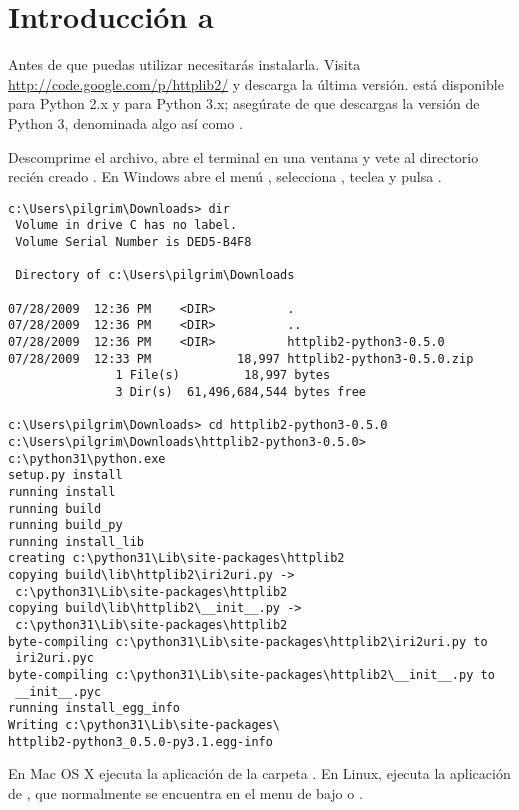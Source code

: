 \section{Introducción a }
\label{sec:httplib2}

Antes de que puedas utilizar  necesitarás instalarla. Visita \href{http://code.google.com/p/httplib2/}{http://code.google.com/p/httplib2/} y descarga la última versión.  está disponible para Python 2.x y para Python 3.x; asegúrate de que descargas la versión de Python 3, denominada algo así como .

Descomprime el archivo, abre el terminal en una ventana y vete al directorio recién creado . En Windows abre el menú , selecciona , teclea  y pulsa .

\noindent\begin{minipage}{\textwidth}
\begin{lstlisting}[mathescape=False]
c:\Users\pilgrim\Downloads> dir
 Volume in drive C has no label.
 Volume Serial Number is DED5-B4F8

 Directory of c:\Users\pilgrim\Downloads

07/28/2009  12:36 PM    <DIR>          .
07/28/2009  12:36 PM    <DIR>          ..
07/28/2009  12:36 PM    <DIR>          httplib2-python3-0.5.0
07/28/2009  12:33 PM            18,997 httplib2-python3-0.5.0.zip
               1 File(s)         18,997 bytes
               3 Dir(s)  61,496,684,544 bytes free

c:\Users\pilgrim\Downloads> cd httplib2-python3-0.5.0
c:\Users\pilgrim\Downloads\httplib2-python3-0.5.0> c:\python31\python.exe 
setup.py install
running install
running build
running build_py
running install_lib
creating c:\python31\Lib\site-packages\httplib2
copying build\lib\httplib2\iri2uri.py -> 
 c:\python31\Lib\site-packages\httplib2
copying build\lib\httplib2\__init__.py -> 
 c:\python31\Lib\site-packages\httplib2
byte-compiling c:\python31\Lib\site-packages\httplib2\iri2uri.py to
 iri2uri.pyc
byte-compiling c:\python31\Lib\site-packages\httplib2\__init__.py to
 __init__.pyc
running install_egg_info
Writing c:\python31\Lib\site-packages\
httplib2-python3_0.5.0-py3.1.egg-info
\end{lstlisting}
\end{minipage}

En Mac OS X ejecuta la aplicación  de la carpeta . En Linux, ejecuta la aplicación de , que normalmente se encuentra en el menu de  bajo  o .

